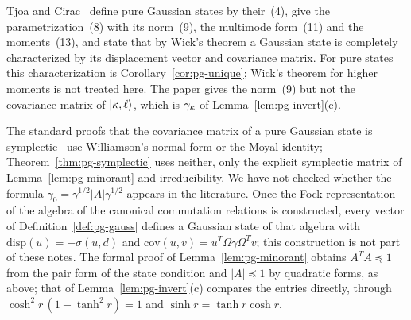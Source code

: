 \begin{veteenv}
Tjoa and Cirac~\cite[Sec.~II\,A]{tjoacirac} define pure Gaussian states by their~(4), give the parametrization~(8) with its norm~(9), the
multimode form~(11) and the moments~(13), and state that by Wick's theorem a Gaussian state is completely characterized by its
displacement vector and covariance matrix. For pure states this characterization is Corollary~\ref{cor:pg-unique}; Wick's theorem for
higher moments is not treated here. The paper gives the norm~(9) but not the covariance matrix of $\lvert \kappa,\ell\rangle$, which is $\gamma_\kappa$
of Lemma~\ref{lem:pg-invert}(c).

 The standard proofs that the covariance matrix of a pure Gaussian state is
symplectic~\cite{folland,serafini} use Williamson's normal form or the Moyal identity; Theorem~\ref{thm:pg-symplectic} uses
neither, only the explicit symplectic matrix of Lemma~\ref{lem:pg-minorant} and irreducibility.  We have not checked whether the formula $\gamma_0=\gamma^{1/2}\lvert A\rvert\gamma^{1/2}$
appears in the literature. Once the Fock representation of the algebra of the canonical commutation relations is constructed, every
vector of Definition~\ref{def:pg-gauss} defines a Gaussian state of that algebra with $\mathrm{disp}(u)=-\sigma(u,d)$ and
$\mathrm{cov}(u,v)=u^T\Omega\gamma\Omega^Tv$; this construction is not part of these notes.  The formal proof of
Lemma~\ref{lem:pg-minorant} obtains $A^TA\preceq1$ from the pair form of the state condition and $\lvert A\rvert\preceq1$ by quadratic forms, as
above; that of Lemma~\ref{lem:pg-invert}(c) compares the entries directly, through $\cosh^2r\,(1-\tanh^2r)=1$ and $\sinh r=\tanh r\cosh r$.

\end{veteenv}
